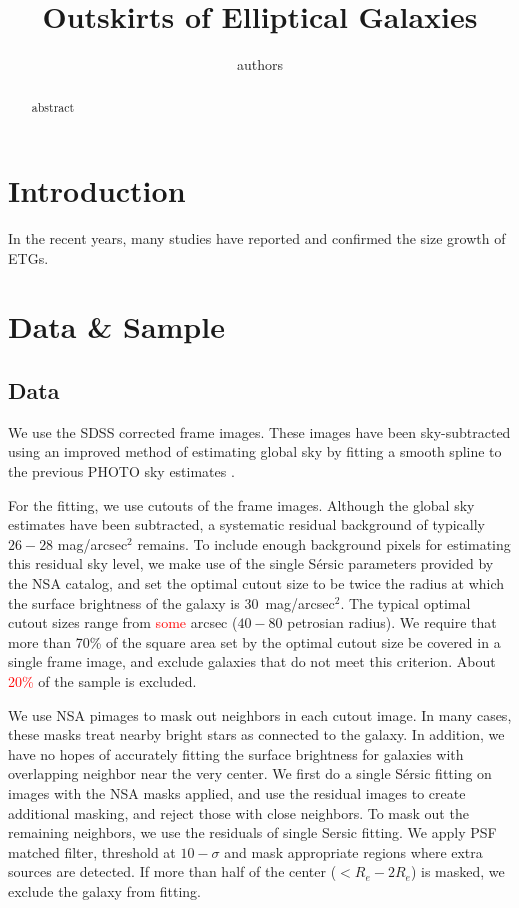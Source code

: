 \documentclass[iop]{emulateapj}
\newcommand{\Sersic}{S\'ersic}
\renewcommand{\Re}{\ensuremath{R_e}}
\newcommand\todo[1]{\textcolor{red}{#1}}
\begin{document}
\title{Outskirts of Elliptical Galaxies}
\author{authors}


\begin{abstract}
    abstract    
\end{abstract}    


\section{Introduction}

In the recent years, many studies have reported and confirmed the size growth
of ETGs.

\section{Data \& Sample}

\subsection{Data}
We use the SDSS corrected frame images. These images have been
sky-subtracted using an improved method of estimating global sky by fitting
a smooth spline to the previous PHOTO sky estimates
\citep[see][for details]{blanton2011}.

For the fitting, we use cutouts of the frame images.
Although the global sky estimates have been subtracted, a systematic residual
background of typically $26-28$ mag/arcsec$^2$ remains.
To include enough background pixels for estimating this residual sky level,
we make use of the single \Sersic{} parameters provided by the NSA catalog,
and set the optimal cutout size to be twice the radius at which the surface
brightness of the galaxy is 30~mag/arcsec$^2$.
The typical optimal cutout sizes range from
\todo{some} arcsec ($40-80$ petrosian radius).
We require that more than 70\% of the square area set by the optimal cutout
size be covered in a single frame image,
and exclude galaxies that do not meet this criterion.
About \todo{20\%} of the sample is excluded.

We use NSA pimages to mask out neighbors in each cutout image.
In many cases, these masks treat nearby bright stars as connected to the galaxy.
In addition, we have no hopes of accurately fitting the surface brightness
for galaxies with overlapping neighbor near the very center.
We first do a single \Sersic{} fitting on images with the NSA masks applied,
and use the residual images to create additional masking,
and reject those with close neighbors.
To mask out the remaining neighbors, we use the residuals of single Sersic
fitting.
We apply PSF matched filter, threshold at $10-\sigma$ and mask appropriate
regions where extra sources are detected.
If more than half of the center ($< \Re - 2\Re$) is masked, we exclude
the galaxy from fitting.
\end{document}
